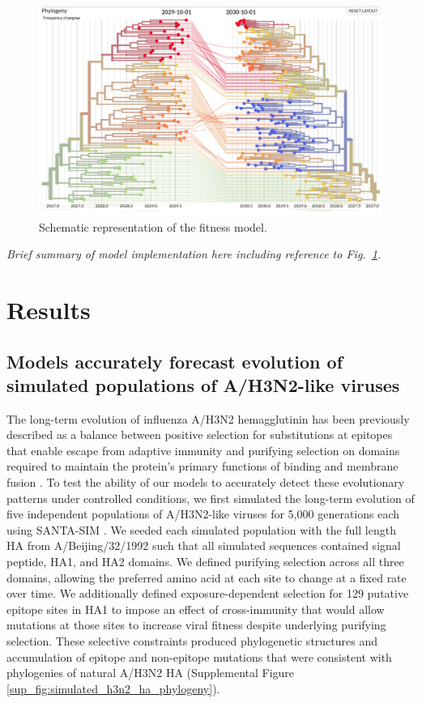 \begin{figure}[t]
  \begin{center}
  \includegraphics[width=\textwidth]{figures/model.png}
  \caption{Schematic representation of the fitness model.}
  \label{fig:model}
  \end{center}
\end{figure}

\textit{Brief summary of model implementation here including reference to Fig.~\ref{fig:model}.}

\section*{Results}

\subsection*{Models accurately forecast evolution of simulated populations of {A/H3N2-like viruses}}

The long-term evolution of influenza A/H3N2 hemagglutinin has been previously described as a balance between positive selection for substitutions at epitopes that enable escape from adaptive immunity and purifying selection on domains required to maintain the protein's primary functions of binding and membrane fusion \cite{Bush:1999vj,Neher2013,Luksza:2014hj,Koelle:2015dh}.
To test the ability of our models to accurately detect these evolutionary patterns under controlled conditions, we first simulated the long-term evolution of five independent populations of A/H3N2-like viruses for 5,000 generations each using SANTA-SIM \cite{Jariani2019}.
We seeded each simulated population with the full length HA from A/Beijing/32/1992 such that all simulated sequences contained signal peptide, HA1, and HA2 domains.
We defined purifying selection across all three domains, allowing the preferred amino acid at each site to change at a fixed rate over time.
We additionally defined exposure-dependent selection for 129 putative epitope sites in HA1 \cite{Wolf:2006da} to impose an effect of cross-immunity that would allow mutations at those sites to increase viral fitness despite underlying purifying selection.
These selective constraints produced phylogenetic structures and accumulation of epitope and non-epitope mutations that were consistent with phylogenies of natural A/H3N2 HA (Supplemental Figure \ref{sup_fig:simulated_h3n2_ha_phylogeny}).

